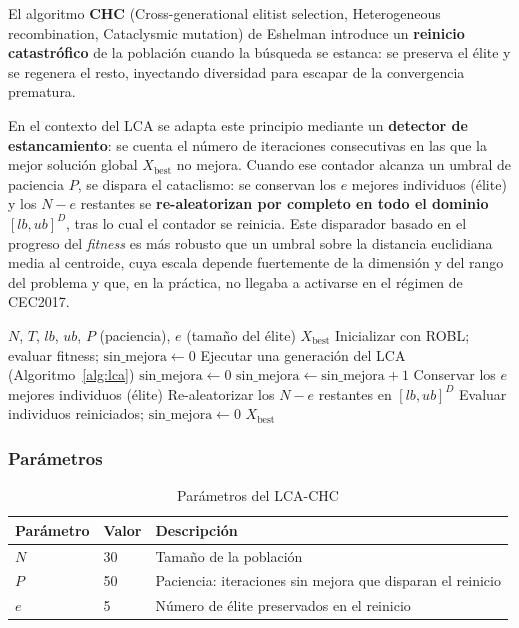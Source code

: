 El algoritmo \textbf{CHC} (Cross-generational elitist selection, Heterogeneous recombination,
Cataclysmic mutation) de Eshelman \cite{eshelman1991chc} introduce un \textbf{reinicio
catastrófico} de la población cuando la búsqueda se estanca: se preserva el élite y se
regenera el resto, inyectando diversidad para escapar de la convergencia prematura.

En el contexto del LCA se adapta este principio mediante un \textbf{detector de estancamiento}:
se cuenta el número de iteraciones consecutivas en las que la mejor solución global
$X_{\text{best}}$ no mejora. Cuando ese contador alcanza un umbral de paciencia $P$, se
dispara el cataclismo: se conservan los $e$ mejores individuos (élite) y los $N-e$ restantes
se \textbf{re-aleatorizan por completo en todo el dominio} $[lb,ub]^D$, tras lo cual el
contador se reinicia. Este disparador basado en el progreso del \emph{fitness} es más robusto
que un umbral sobre la distancia euclidiana media al centroide, cuya escala depende
fuertemente de la dimensión y del rango del problema y que, en la práctica, no llegaba a
activarse en el régimen de CEC2017.

\begin{algorithm}[H]
\caption{LCA-CHC: LCA con reinicio catastrófico por estancamiento}
\label{alg:lcachc}
\begin{algorithmic}[1]
\Require $N$, $T$, $lb$, $ub$, $P$ (paciencia), $e$ (tamaño del élite)
\Ensure $X_{\text{best}}$
\State Inicializar con ROBL; evaluar fitness; $\text{sin\_mejora} \leftarrow 0$
  \State Ejecutar una generación del LCA (Algoritmo~\ref{alg:lca})
    \State $\text{sin\_mejora} \leftarrow 0$
  \Else
    \State $\text{sin\_mejora} \leftarrow \text{sin\_mejora} + 1$
  \EndIf
   
    \State Conservar los $e$ mejores individuos (élite)
    \State Re-aleatorizar los $N-e$ restantes en $[lb,ub]^D$
    \State Evaluar individuos reiniciados; $\text{sin\_mejora} \leftarrow 0$
  \EndIf
\EndFor
\State \Return $X_{\text{best}}$
\end{algorithmic}
\end{algorithm}

\subsubsection{Parámetros}

\begin{table}[h!]
\centering
\caption{Parámetros del LCA-CHC}
\label{tab:params_chc}
\renewcommand{\arraystretch}{1.3}
\begin{tabular}{@{}lll@{}}
\toprule
\textbf{Parámetro} & \textbf{Valor} & \textbf{Descripción} \\
\midrule
$N$ & 30 & Tamaño de la población \\
$P$ & 50 & Paciencia: iteraciones sin mejora que disparan el reinicio \\
$e$ & 5  & Número de élite preservados en el reinicio \\
\bottomrule
\end{tabular}
\end{table}


